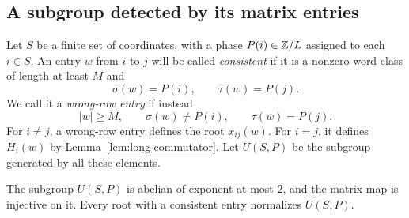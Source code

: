 \subsection{A subgroup detected by its matrix entries}

Let $S$ be a finite set of coordinates, with a phase
$P(i)\in\mathbb Z/L$ assigned to each $i\in S$. An entry $w$ from $i$ to
$j$ will be called \emph{consistent} if it is a nonzero word class
of length at least $M$ and
\[
 \sigma(w)=P(i),\qquad \tau(w)=P(j).
\]
We call it a \emph{wrong-row entry} if instead
\begin{equation}\label{eq:wrong-row}
 |w|\ge M,\qquad \sigma(w)\ne P(i),\qquad \tau(w)=P(j).
\end{equation}
For $i\ne j$, a wrong-row entry defines the root $x_{ij}(w)$.
For $i=j$, it defines $H_i(w)$ by
Lemma~\ref{lem:long-commutator}. Let $U(S,P)$ be the subgroup
generated by all these elements.

\begin{lemma}\label{lem:wrong-row}
The subgroup $U(S,P)$ is abelian of exponent at most $2$, and the
matrix map is injective on it. Every root with a consistent entry
normalizes $U(S,P)$.
\end{lemma}

